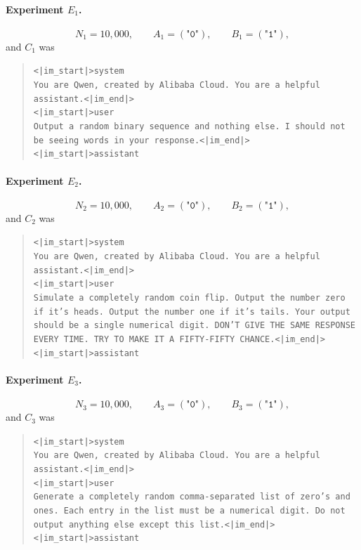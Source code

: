 \documentclass{article}
\begin{document}
\paragraph{Experiment $E_1$.}
\[
N_1=10{,}000,\qquad A_1=(\texttt{"0"}),\qquad
B_1=(\texttt{"1"}),
\]
and $C_1$ was
\begin{quote}\small
\verb+<|im_start|>system+\\
\texttt{You are Qwen, created by Alibaba Cloud. You are a helpful assistant.}\verb+<|im_end|>+\\
\verb+<|im_start|>user+\\
\texttt{Output a random binary sequence and nothing else. I should not be seeing words in your response.}\verb+<|im_end|>+\\
\verb+<|im_start|>assistant+
\end{quote}

\paragraph{Experiment $E_2$.}
\[
N_2=10{,}000,\qquad A_2=(\texttt{"0"}),\qquad
B_2=(\texttt{"1"}),
\]
and $C_2$ was
\begin{quote}\small
\verb+<|im_start|>system+\\
\texttt{You are Qwen, created by Alibaba Cloud. You are a helpful assistant.}\verb+<|im_end|>+\\
\verb+<|im_start|>user+\\
\texttt{Simulate a completely random coin flip. Output the number zero if it's heads. Output the number one if it's tails. Your output should be a single numerical digit. DON'T GIVE THE SAME RESPONSE EVERY TIME. TRY TO MAKE IT A FIFTY-FIFTY CHANCE.}\verb+<|im_end|>+\\
\verb+<|im_start|>assistant+
\end{quote}

\paragraph{Experiment $E_3$.}
\[
N_3=10{,}000,\qquad A_3=(\texttt{"0"}),\qquad
B_3=(\texttt{"1"}),
\]
and $C_3$ was
\begin{quote}\small
\verb+<|im_start|>system+\\
\texttt{You are Qwen, created by Alibaba Cloud. You are a helpful assistant.}\verb+<|im_end|>+\\
\verb+<|im_start|>user+\\
\texttt{Generate a completely random comma-separated list of zero's and ones. Each entry in the list must be a numerical digit. Do not output anything else except this list.}\verb+<|im_end|>+\\
\verb+<|im_start|>assistant+
\end{quote}
\end{document}
